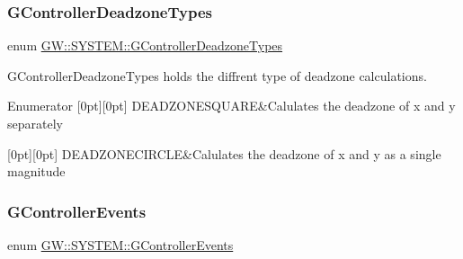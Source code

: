 \subsubsection{\texorpdfstring{GControllerDeadzoneTypes}{GControllerDeadzoneTypes}}
{\footnotesize\ttfamily enum \mbox{\hyperlink{namespaceGW_1_1SYSTEM_a31011e5fdef70ea7c975794fe99319d4}{G\+W\+::\+S\+Y\+S\+T\+E\+M\+::\+G\+Controller\+Deadzone\+Types}}}



G\+Controller\+Deadzone\+Types holds the diffrent type of deadzone calculations. 

\begin{DoxyEnumFields}{Enumerator}
[0pt][0pt]{}\mbox{\label{namespaceGW_1_1SYSTEM_a31011e5fdef70ea7c975794fe99319d4a2607a103270014a3cd2944001009848a}} 
D\+E\+A\+D\+Z\+O\+N\+E\+S\+Q\+U\+A\+RE&Calulates the deadzone of x and y separately \\
\hline

[0pt][0pt]{}\mbox{\label{namespaceGW_1_1SYSTEM_a31011e5fdef70ea7c975794fe99319d4a96eca15634dfc446bcbf235e559052fa}} 
D\+E\+A\+D\+Z\+O\+N\+E\+C\+I\+R\+C\+LE&Calulates the deadzone of x and y as a single magnitude \\
\hline

\end{DoxyEnumFields}
\mbox{\label{namespaceGW_1_1SYSTEM_a90b22b31302f4172043122adfa8e49d7}} 
\subsubsection{\texorpdfstring{GControllerEvents}{GControllerEvents}}
{\footnotesize\ttfamily enum \mbox{\hyperlink{namespaceGW_1_1SYSTEM_a90b22b31302f4172043122adfa8e49d7}{G\+W\+::\+S\+Y\+S\+T\+E\+M\+::\+G\+Controller\+Events}}}



